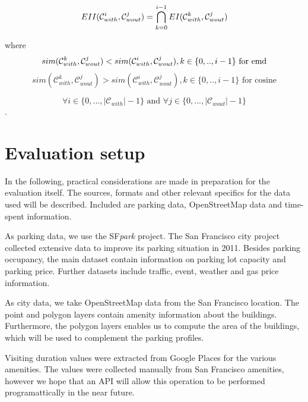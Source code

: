 \documentclass{ws-ijait}
\begin{document}
	\begin{equation}
	EII(\mathcal{C}_{with}^i,\mathcal{C}_{wout}^j) = \bigcap_{k=0}^{i-1} EI(\mathcal{C}_{with}^k,\mathcal{C}_{wout}^j) \\
	\end{equation}
	
	where
	\begin{equation}
	sim(\mathcal{C}_{with}^k,\mathcal{C}_{wout}^j) < sim(\mathcal{C}_{with}^i,\mathcal{C}_{wout}^j), k \in \{0,..,i - 1\} \text{ for emd}\\
	\end{equation}
	\begin{equation}
	sim(\mathcal{C}_{with}^k,\mathcal{C}_{wout}^j) > sim(\mathcal{C}_{with}^i,\mathcal{C}_{wout}^j), k \in \{0,..,i - 1\} \text{ for cosine} 
	\end{equation}
	
	$$\forall i \in \{0,...,|\mathcal{C}_{with}|-1\} \text{ and } \forall j \in \{0,...,|\mathcal{C}_{wout}|-1\}$$.
	
	\section{Evaluation setup}
	In the following, practical considerations are made in preparation for the evaluation itself. The sources, formats and other relevant specifics for the data used will be described. Included are parking data, OpenStreetMap data and time-spent information.
	
	As parking data, we use the SF\textit{park} project. The San Francisco city project collected extensive data to improve its parking situation in 2011. Besides parking occupancy, the main dataset contain information on parking lot capacity and parking price. Further datasets include traffic, event, weather and gas price information.
	
	As city data, we take OpenStreetMap data from the San Francisco location. The point and polygon layers contain amenity information about the buildings. Furthermore, the polygon layers enables us to compute the area of the buildings, which will be used to complement the parking profiles.
	
	Visiting duration values were extracted from Google Places for the various amenities. The values were collected manually from San Francisco amenities, however we hope that an API will allow this operation to be performed programattically in the near future.
	
\end{document}
